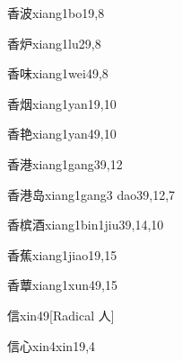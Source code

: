 \begin{verbete}{香波}{xiang1bo1}{9,8}
\end{verbete}

\begin{verbete}{香炉}{xiang1lu2}{9,8}
\end{verbete}

\begin{verbete}{香味}{xiang1wei4}{9,8}
\end{verbete}

\begin{verbete}{香烟}{xiang1yan1}{9,10}
\end{verbete}

\begin{verbete}{香艳}{xiang1yan4}{9,10}
\end{verbete}

\begin{verbete}{香港}{xiang1gang3}{9,12}
\end{verbete}

\begin{verbete}{香港岛}{xiang1gang3 dao3}{9,12,7}
\end{verbete}

\begin{verbete}{香槟酒}{xiang1bin1jiu3}{9,14,10}
\end{verbete}

\begin{verbete}{香蕉}{xiang1jiao1}{9,15}
\end{verbete}

\begin{verbete}{香蕈}{xiang1xun4}{9,15}
\end{verbete}

\begin{verbete}{信}{xin4}{9}[Radical 人]
\end{verbete}

\begin{verbete}{信心}{xin4xin1}{9,4}
\end{verbete}

